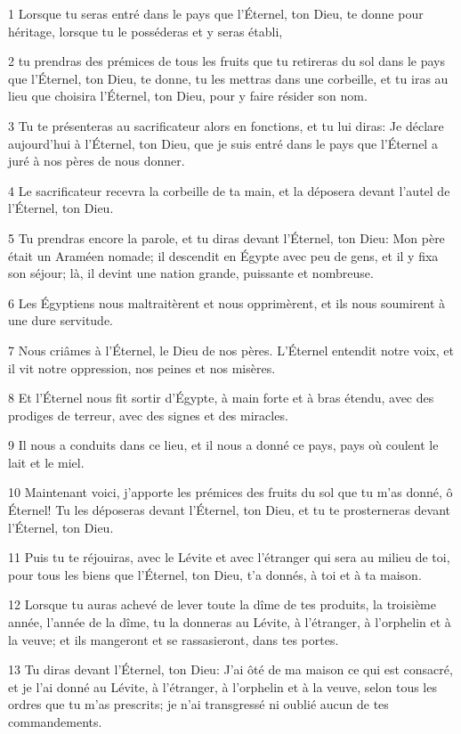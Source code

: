 \par 1 Lorsque tu seras entré dans le pays que l'Éternel, ton Dieu, te donne pour héritage, lorsque tu le posséderas et y seras établi,
\par 2 tu prendras des prémices de tous les fruits que tu retireras du sol dans le pays que l'Éternel, ton Dieu, te donne, tu les mettras dans une corbeille, et tu iras au lieu que choisira l'Éternel, ton Dieu, pour y faire résider son nom.
\par 3 Tu te présenteras au sacrificateur alors en fonctions, et tu lui diras: Je déclare aujourd'hui à l'Éternel, ton Dieu, que je suis entré dans le pays que l'Éternel a juré à nos pères de nous donner.
\par 4 Le sacrificateur recevra la corbeille de ta main, et la déposera devant l'autel de l'Éternel, ton Dieu.
\par 5 Tu prendras encore la parole, et tu diras devant l'Éternel, ton Dieu: Mon père était un Araméen nomade; il descendit en Égypte avec peu de gens, et il y fixa son séjour; là, il devint une nation grande, puissante et nombreuse.
\par 6 Les Égyptiens nous maltraitèrent et nous opprimèrent, et ils nous soumirent à une dure servitude.
\par 7 Nous criâmes à l'Éternel, le Dieu de nos pères. L'Éternel entendit notre voix, et il vit notre oppression, nos peines et nos misères.
\par 8 Et l'Éternel nous fit sortir d'Égypte, à main forte et à bras étendu, avec des prodiges de terreur, avec des signes et des miracles.
\par 9 Il nous a conduits dans ce lieu, et il nous a donné ce pays, pays où coulent le lait et le miel.
\par 10 Maintenant voici, j'apporte les prémices des fruits du sol que tu m'as donné, ô Éternel! Tu les déposeras devant l'Éternel, ton Dieu, et tu te prosterneras devant l'Éternel, ton Dieu.
\par 11 Puis tu te réjouiras, avec le Lévite et avec l'étranger qui sera au milieu de toi, pour tous les biens que l'Éternel, ton Dieu, t'a donnés, à toi et à ta maison.
\par 12 Lorsque tu auras achevé de lever toute la dîme de tes produits, la troisième année, l'année de la dîme, tu la donneras au Lévite, à l'étranger, à l'orphelin et à la veuve; et ils mangeront et se rassasieront, dans tes portes.
\par 13 Tu diras devant l'Éternel, ton Dieu: J'ai ôté de ma maison ce qui est consacré, et je l'ai donné au Lévite, à l'étranger, à l'orphelin et à la veuve, selon tous les ordres que tu m'as prescrits; je n'ai transgressé ni oublié aucun de tes commandements.
